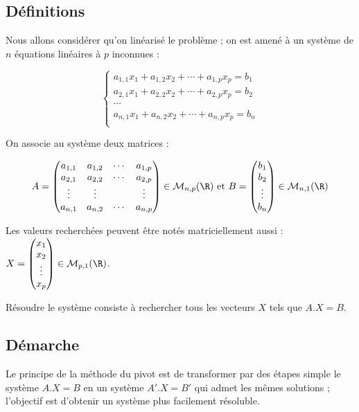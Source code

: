 \subsection{Définitions}
Nous allons considérer qu'on linéarisé le problème ; on est amené à un système de $n$ équations linéaires à $p$ inconnues :

\[\left\{
\begin{matrix}a_{1,1}x_1+a_{1,2}x_2+\cdots+a_{1,p}x_p=b_1\\
a_{2,1}x_1+a_{2,2}x_2+\cdots+a_{2,p}x_p=b_2\\
\cdots\\
a_{n,1}x_1+a_{n,2}x_2+\cdots+a_{n,p}x_p=b_n\\
\end{matrix}\right. 
\]


On associe au système deux matrices : 

\[A=\begin{pmatrix}a_{1,1}&a_{1,2}&\cdots&a_{1,p}\\
a_{2,1}&a_{2,2}&\cdots&a_{2,p}\\
\vdots&\vdots&&\vdots\\
a_{n,1}&a_{n,2}&\cdots&a_{n,p}\\
\end{pmatrix}\in{\cal M}_{n,p}({\R})
\hbox{ et }
B=\begin{pmatrix}b_1\\
b_2\\
\vdots\\
b_n\\
\end{pmatrix}\in{\cal M}_{n,1}({\R})\]

Les valeurs recherchées peuvent être notés matriciellement aussi : $X=\begin{pmatrix}x_1\\
x_2\\
\vdots\\
x_p\\
\end{pmatrix} \in{\cal M}_{p,1}({\R})$.

Résoudre le système consiste à rechercher tous les vecteurs $X$ tels que $A.X=B$.
\subsection{Démarche}
Le principe de la méthode du pivot est de transformer par des étapes simple le système $A.X=B$ en un système $A'.X=B'$ qui admet les mêmes solutions ; l'objectif est d'obtenir un système plus facilement résoluble.

